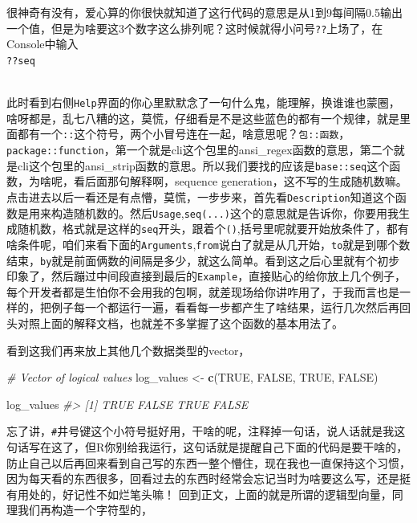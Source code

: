 \documentclass[
]{book}
\newenvironment{Shaded}{\begin{snugshade}}{\end{snugshade}}
\newcommand{\CommentTok}[1]{\textcolor[rgb]{0.56,0.35,0.01}{\textit{#1}}}
\newcommand{\ConstantTok}[1]{\textcolor[rgb]{0.56,0.35,0.01}{#1}}
\newcommand{\FunctionTok}[1]{\textcolor[rgb]{0.13,0.29,0.53}{\textbf{#1}}}
\newcommand{\NormalTok}[1]{#1}
\newcommand{\OtherTok}[1]{\textcolor[rgb]{0.56,0.35,0.01}{#1}}
\begin{document}
很神奇有没有，爱心算的你很快就知道了这行代码的意思是从1到9每间隔0.5输出一个值，但是为啥要这3个数字这么排列呢？这时候就得小问号\texttt{??}上场了，在Console中输入\\
\texttt{??seq}\strut \\
此时看到右侧\texttt{Help}界面的你心里默默念了一句什么鬼，能理解，换谁谁也蒙圈，啥呀都是，乱七八糟的这，莫慌，仔细看是不是这些蓝色的都有一个规律，就是里面都有一个\texttt{::}这个符号，两个小冒号连在一起，啥意思呢？\texttt{包::函数}，\texttt{package::function}，第一个就是cli这个包里的ansi\_regex函数的意思，第二个就是cli这个包里的ansi\_strip函数的意思。所以我们要找的应该是\texttt{base::seq}这个函数，为啥呢，看后面那句解释啊，sequence generation，这不写的生成随机数嘛。\\
点击进去以后一看还是有点懵，莫慌，一步步来，首先看\texttt{Description}知道这个函数是用来构造随机数的。然后\texttt{Usage},\texttt{seq(...)}这个的意思就是告诉你，你要用我生成随机数，格式就是这样的\texttt{seq}开头，跟着个\texttt{()},括号里呢就要开始放条件了，都有啥条件呢，咱们来看下面的\texttt{Arguments},\texttt{from}说白了就是从几开始，\texttt{to}就是到哪个数结束，\texttt{by}就是前面俩数的间隔是多少，就这么简单。看到这之后心里就有个初步印象了，然后蹦过中间段直接到最后的\texttt{Example}，直接贴心的给你放上几个例子，每个开发者都是生怕你不会用我的包啊，就差现场给你讲咋用了，于我而言也是一样的，把例子每一个都运行一遍，看看每一步都产生了啥结果，运行几次然后再回头对照上面的解释文档，也就差不多掌握了这个函数的基本用法了。

看到这我们再来放上其他几个数据类型的vector，

\begin{Shaded}
\begin{Highlighting}[]
\CommentTok{\# Vector of logical values}
\NormalTok{log\_values }\OtherTok{\textless{}{-}} \FunctionTok{c}\NormalTok{(}\ConstantTok{TRUE}\NormalTok{, }\ConstantTok{FALSE}\NormalTok{, }\ConstantTok{TRUE}\NormalTok{, }\ConstantTok{FALSE}\NormalTok{)}

\NormalTok{log\_values}
\CommentTok{\#\textgreater{} [1]  TRUE FALSE  TRUE FALSE}
\end{Highlighting}
\end{Shaded}

忘了讲，\texttt{\#}井号键这个小符号挺好用，干啥的呢，注释掉一句话，说人话就是我这句话写在这了，但R你别给我运行，这句话就是提醒自己下面的代码是要干啥的，防止自己以后再回来看到自己写的东西一整个懵住，现在我也一直保持这个习惯，因为每天看的东西很多，回看过去的东西时经常会忘记当时为啥要这么写，还是挺有用处的，好记性不如烂笔头嘛！
回到正文，上面的就是所谓的逻辑型向量，同理我们再构造一个字符型的，
\end{document}
